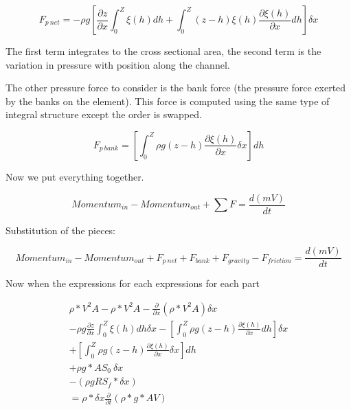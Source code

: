 \begin{equation}
F_{p~net}  = -\rho g [\frac{\partial z}{\partial x}\int_{0}^{Z} \xi(h) dh + \int_{0}^{Z} (z-h) \xi(h) \frac{\partial \xi(h)}{\partial x} dh] \delta x
\end{equation}

The first term integrates to the cross sectional area, the second term is the variation in pressure with position along the channel.

The other pressure force to consider is the bank force (the pressure force exerted by the banks on the element).  This force is computed using the same type of integral structure except the order is swapped.

\begin{equation}
F_{p~bank} =  [\int_{0}^{Z} \rho g (z-h) \frac{\partial \xi(h)}{\partial x} \delta x] dh
\end{equation}

Now we put everything together.

\begin{equation}
{Momentum}_{in}-{Momentum}_{out} + \sum{F} = \frac{d(mV)}{dt}
\end{equation}

Substitution of the pieces:

\begin{equation}
{Momentum}_{in}-{Momentum}_{out} + F_{p~net}+F_{bank} + F_{gravity} - F_{friction}  = \frac{d(mV)}{dt}
\end{equation}

Now when the expressions for each expressions for each part

\begin{equation}
\begin{split}
\rho*V^2A- \rho*V^2A-\frac{\partial}{\partial x}(\rho*V^2A)\delta x  \\
-\rho g \frac{\partial z}{\partial x}\int_{0}^{Z} \xi(h) dh \delta x
- [\int_{0}^{Z}\rho g (z-h)  \frac{\partial \xi(h)}{\partial x} dh] \delta x \\ 
+[\int_{0}^{Z} \rho g (z-h) \frac{\partial \xi(h)}{\partial x} \delta x] dh\\
+\rho g *AS_0~\delta x \\- (\rho g R S_f * \delta x)  \\ =  \rho*\delta x\frac{\partial}{\partial t}(\rho*g *AV)
 \\
\end{split}
\label{eqn:momentum_expanded}
\end{equation}

